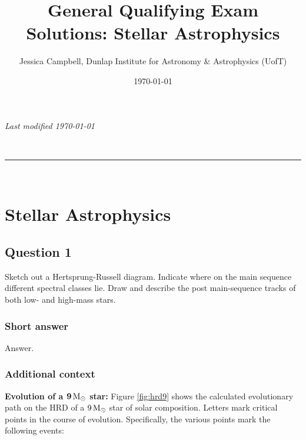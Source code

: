 \documentclass[a4paper,10pt]{article}
\makeatletter
\newcommand{\linia}{\rule{\linewidth}{0.5pt}}
\renewcommand{\maketitle}{
\begin{center}
\vspace{2ex}
{\huge \textsc{\@title}}
\vspace{1ex}
\\
\linia\\
\@author
\vspace{4ex}
\end{center}
}
\makeatother
\begin{document}
\hfill{\textit{Last modified \today}}
\title{General Qualifying Exam Solutions: Stellar Astrophysics}
\author{Jessica Campbell, Dunlap Institute for Astronomy \& Astrophysics (UofT)}
\date{\today}
\maketitle

\tableofcontents



%
%
%
%

\newpage
\section{Stellar Astrophysics}


\subsection{Question 1}

Sketch out a Hertsprung-Russell diagram. Indicate where on the main sequence different spectral classes lie. Draw and describe the post main-sequence tracks of both low- and high-mass stars.

\subsubsection{Short answer}

Answer.

\subsubsection{Additional context}

{\noindent}\textbf{Evolution of a $\mathbf{9\,{\rm M_\odot}}$ star:} Figure \ref{fig:hrd9} shows the calculated evolutionary path on the HRD of a $9\,{\rm M_\odot}$ star of solar composition. Letters mark critical points in the course of evolution. Specifically, the various points mark the following events:
\end{document}
